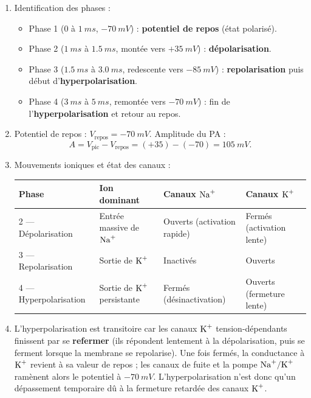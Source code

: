\documentclass[11pt]{article}
\begin{document}
\begin{corrige}
\begin{enumerate}
    \item Identification des phases :
    \begin{itemize}
        \item Phase 1 ($0$ à $\SI{1}{ms}$, $-\SI{70}{mV}$) : \textbf{potentiel de repos} (état polarisé).
        \item Phase 2 ($\SI{1}{ms}$ à $\SI{1,5}{ms}$, montée vers $+\SI{35}{mV}$) : \textbf{dépolarisation}.
        \item Phase 3 ($\SI{1,5}{ms}$ à $\SI{3,0}{ms}$, redescente vers $-\SI{85}{mV}$) : \textbf{repolarisation} puis début d'\textbf{hyperpolarisation}.
        \item Phase 4 ($\SI{3}{ms}$ à $\SI{5}{ms}$, remontée vers $-\SI{70}{mV}$) : fin de l'\textbf{hyperpolarisation} et retour au repos.
    \end{itemize}
    \item Potentiel de repos : $V_{\text{repos}} = -\SI{70}{mV}$. Amplitude du PA :
    \[ A = V_{\text{pic}} - V_{\text{repos}} = (+35) - (-70) = \SI{105}{mV}. \]
    \item Mouvements ioniques et état des canaux :
    \begin{center}
    \begin{tabularx}{\linewidth}{|l|X|X|X|}\hline
    \rowcolor{popblueL}
    \textbf{Phase} & \textbf{Ion dominant} & \textbf{Canaux $\ce{Na+}$} & \textbf{Canaux $\ce{K+}$} \\ \hline
    2 — Dépolarisation & Entrée massive de $\ce{Na+}$ & Ouverts (activation rapide) & Fermés (activation lente) \\ \hline
    3 — Repolarisation & Sortie de $\ce{K+}$ & Inactivés & Ouverts \\ \hline
    4 — Hyperpolarisation & Sortie de $\ce{K+}$ persistante & Fermés (désinactivation) & Ouverts (fermeture lente) \\ \hline
    \end{tabularx}
    \end{center}
    \item L'hyperpolarisation est transitoire car les canaux $\ce{K+}$ tension-dépendants finissent par se \textbf{refermer} (ils répondent lentement à la dépolarisation, puis se ferment lorsque la membrane se repolarise). Une fois fermés, la conductance à $\ce{K+}$ revient à sa valeur de repos ; les canaux de fuite et la pompe $\ce{Na+/K+}$ ramènent alors le potentiel à $-\SI{70}{mV}$. L'hyperpolarisation n'est donc qu'un dépassement temporaire dû à la fermeture retardée des canaux $\ce{K+}$.
\end{enumerate}
\end{corrige}
\end{document}
